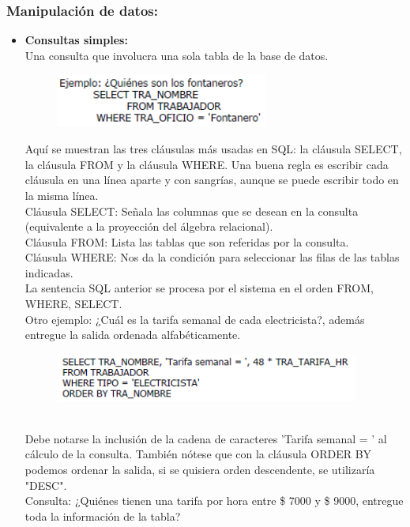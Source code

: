 \documentclass[preprint,12pt]{elsarticle}
\begin{document}
\subsubsection{\textbf{Manipulación de datos:}}
\begin{itemize}
\item \textbf{Consultas simples:} \\ Una consulta que involucra una sola tabla de la base de datos.\\
	\begin{figure}[htb]
		\begin{center}
			\includegraphics[width=7cm]{./IMAGENES/consultasimple}
		\end{center}
	\end{figure}
Aquí se muestran las tres cláusulas más usadas en SQL: la cláusula SELECT, la cláusula FROM y la cláusula WHERE. Una buena regla es escribir cada cláusula en una línea aparte y con sangrías, aunque se puede escribir todo en la misma línea. \\ Cláusula SELECT: Señala las columnas que se desean en la consulta (equivalente a la proyección del álgebra relacional). \\ Cláusula FROM: Lista las tablas que son referidas por la consulta. \\ Cláusula WHERE: Nos da la condición para seleccionar las filas de las tablas indicadas. \\ La sentencia SQL anterior se procesa por el sistema en el orden FROM, WHERE, SELECT. \\ Otro ejemplo: ¿Cuál es la tarifa semanal de cada electricista?, además entregue la salida ordenada alfabéticamente.
	\begin{figure}[htb]
		\begin{center}
			\includegraphics[width=10cm]{./IMAGENES/consultasimple2}
		\end{center}
	\end{figure}
\\ Debe notarse la inclusión de la cadena de caracteres 'Tarifa semanal = ' al cálculo de la consulta. También nótese que con la cláusula ORDER BY podemos ordenar la salida, si se quisiera orden descendente, se utilizaría "DESC". \\ Consulta: ¿Quiénes tienen una tarifa por hora entre \$ 7000 y \$ 9000, entregue toda la información de la tabla?

\end{itemize}
\end{document}
